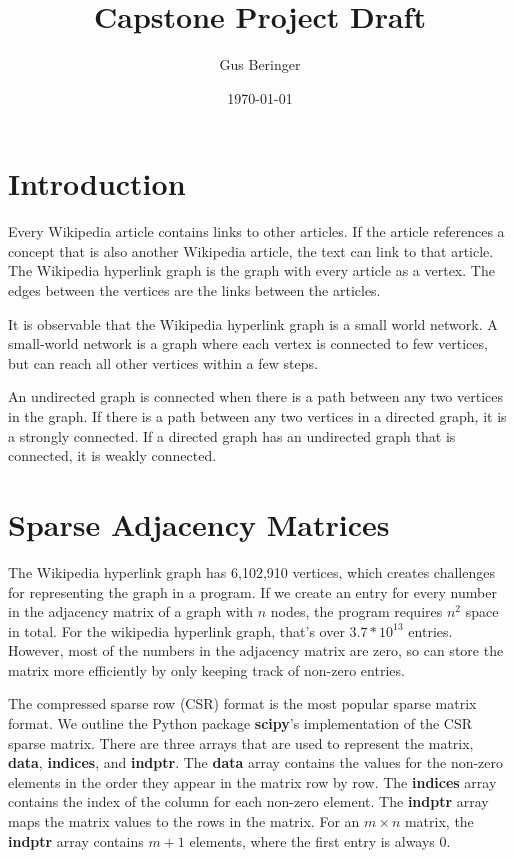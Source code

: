 \documentclass{article}
\author{Gus Beringer}
\title{Capstone Project Draft}
\date{\today}
\begin{document}
\maketitle
\tableofcontents

\section{Introduction}

Every Wikipedia article contains links to other articles. If the article references a concept that is also another Wikipedia article, the text can link to that article.
The Wikipedia hyperlink graph is the graph with every article as a vertex. The edges between the vertices are the links between the articles.

It is observable that the Wikipedia hyperlink graph is a small world network.
A small-world network is a graph where each vertex is connected to few vertices, but can reach all other vertices within a few steps.

An undirected graph is connected when there is a path between any two vertices in the graph.
If there is a path between any two vertices in a directed graph, it is a strongly connected.
If a directed graph has an undirected graph that is connected, it is weakly connected.



\section{Sparse Adjacency Matrices}

The Wikipedia hyperlink graph has 6,102,910 vertices, which creates challenges for representing the graph in a program.
If we create an entry for every number in the adjacency matrix of a graph with $n$ nodes, the program requires $n^2$ space in total.  
For the wikipedia hyperlink graph, that's over $3.7 * 10^{13}$ entries.
However, most of the numbers in the adjacency matrix are zero, so can store the matrix more efficiently by only keeping track of non-zero entries.

The compressed sparse row (CSR) format is the most popular sparse matrix format.
We outline the Python package \textbf{scipy}'s implementation of the CSR sparse matrix.
There are three arrays that are used to represent the matrix, \textbf{data}, \textbf{indices}, and \textbf{indptr}.
\autocite{scipy_doc}
The \textbf{data} array contains the values for the non-zero elements in the order they appear in the matrix row by row.
The \textbf{indices} array contains the index of the column for each non-zero element.
The \textbf{indptr} array maps the matrix values to the rows in the matrix.
For an $m\times n$ matrix, the \textbf{indptr} array contains $m+1$ elements, where the first entry is always 0.
\end{document}
